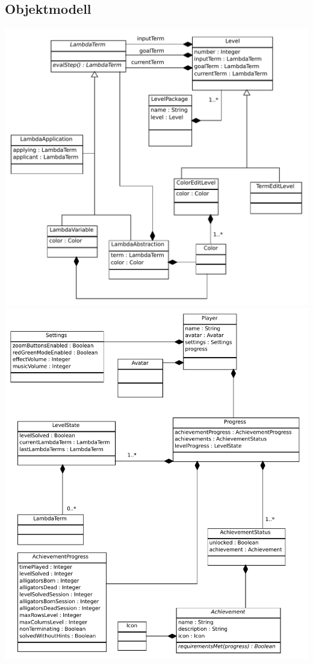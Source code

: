 \subsection{Objektmodell}
\includegraphics[scale=0.6]{Systemmodelle/level_class.pdf}
\clearpage
\includegraphics[scale=0.6]{Systemmodelle/player_class.pdf}
